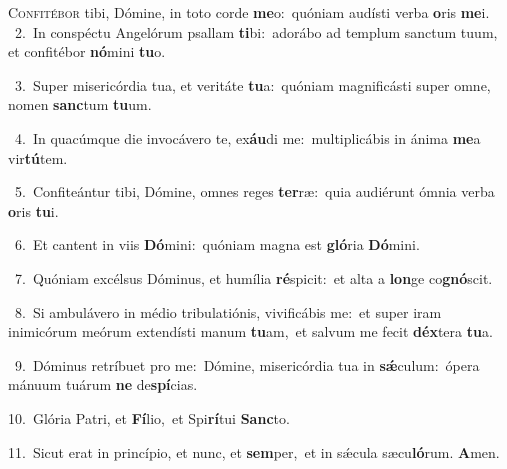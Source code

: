 \lettrine{\initial\textcolor{\initialcolor}{C}}{onfitébor} tibi, Dómine, in toto corde \textbf{me}\-o:~\star quóniam audísti verba \textbf{o}\-ris \textbf{me}\-i.\\
{\numbfont\textcolor{\numbcolor}{~2.}}~In conspéctu Angelórum psallam \textbf{ti}\-bi:~\star adorábo ad templum sanctum tuum, et confitébor \textbf{nó}\-mini \textbf{tu}\-o.\par
{\numbfont\textcolor{\numbcolor}{~3.}}~Super misericórdia tua, et veritáte \textbf{tu}\-a:~\star quóniam magnificásti super omne, nomen \textbf{sanc}\-tum \textbf{tu}\-um.\par
{\numbfont\textcolor{\numbcolor}{~4.}}~In quacúmque die invocávero te, ex\-\textbf{áu}\-di me:~\star multiplicábis in ánima \textbf{me}\-a vir\-\textbf{tú}\-tem.\par
{\numbfont\textcolor{\numbcolor}{~5.}}~Confiteántur tibi, Dómine, omnes reges \textbf{ter}\-ræ:~\star quia audiérunt ómnia verba \textbf{o}\-ris \textbf{tu}\-i.\par
{\numbfont\textcolor{\numbcolor}{~6.}}~Et cantent in viis \textbf{Dó}\-mini:~\star quóniam magna est \textbf{gló}\-ria \textbf{Dó}\-mini.\par
{\numbfont\textcolor{\numbcolor}{~7.}}~Quóniam excélsus Dóminus, et humília \textbf{ré}\-spicit:~\star et alta a \textbf{lon}\-ge co\-\textbf{gnó}\-scit.\par
{\numbfont\textcolor{\numbcolor}{~8.}}~Si ambulávero in médio tribulatiónis, vivificábis me:~\dagger et super iram inimicórum meórum extendísti manum \textbf{tu}\-am,~\star et salvum me fecit \textbf{déx}\-tera \textbf{tu}\-a.\par
{\numbfont\textcolor{\numbcolor}{~9.}}~Dóminus retríbuet pro me:~\dagger Dómine, misericórdia tua in \textbf{sǽ}\-culum:~\star ópera mánuum tuárum \textbf{ne} de\-\textbf{spí}\-cias.\par
{\numbfont\textcolor{\numbcolor}{10.}}~Glória Patri, et \textbf{Fí}\-lio,~\star et Spi\-\textbf{rí}\-tui \textbf{Sanc}\-to.\par
{\numbfont\textcolor{\numbcolor}{11.}}~Sicut erat in princípio, et nunc, et \textbf{sem}\-per,~\star et in sǽcula sæcu\-\textbf{ló}\-rum. \textbf{A}\-men.\par
